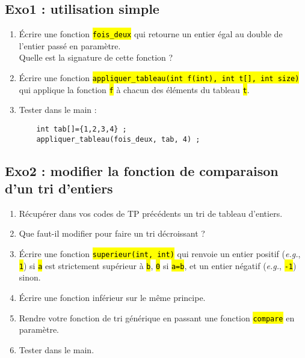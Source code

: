 \documentclass[final, a4paper, openbib, ]{article} %
\let\OldTexttt\texttt
\renewcommand{\texttt}[1]{\OldTexttt{\hl{#1}}}
\begin{document}
\subsection{Exo1 : utilisation simple}
\begin{enumerate}
	\item Écrire une fonction \texttt{fois\_deux} qui retourne un entier égal au double de l'entier passé en paramètre.\\
	Quelle est la signature de cette fonction ?
	\item Écrire une fonction \texttt{appliquer\_tableau(int f(int), int t[], int size)} qui applique la fonction \texttt{f} à chacun des éléments du tableau \texttt{t}.
	
	
	\item Tester dans le main :
	\begin{verbatim}
	int tab[]={1,2,3,4} ;
	appliquer_tableau(fois_deux, tab, 4) ;
	\end{verbatim}
\end{enumerate}


\subsection{Exo2 : modifier la fonction de comparaison d'un tri d'entiers}
\begin{enumerate}
	\item Récupérer dans vos codes de TP précédents un tri de tableau d'entiers.
	\item Que faut-il modifier pour faire un tri décroissant ?
	\item Écrire une fonction \texttt{superieur(int, int)} qui renvoie un entier positif (\textit{e.g.}, \texttt{1}) si \texttt{a} est strictement supérieur à \texttt{b}, \texttt{0} si \texttt{a=b}, et un entier négatif (\textit{e.g.}, \texttt{-1}) sinon.
	\item Écrire une fonction inférieur sur le même principe.
	\item Rendre votre fonction de tri générique en passant une fonction \texttt{compare} en paramètre.
	\item Tester dans le main.
\end{enumerate}
\end{document}
